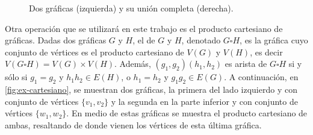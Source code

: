 \begin{figure}[htb!]
    \centering
    \caption{Dos gr\'aficas (izquierda) y su uni\'on completa (derecha).}
\label{fig:ex-unionCompleta}
\end{figure}

Otra operaci\'on que se utilizar\'a en este trabajo es el producto cartesiano de
gr\'aficas. Dadas dos gr\'aficas $G$ y $H$, el  de
$G$ y $H$, denotado $G \square H$, es la gr\'afica cuyo conjunto de v\'ertices
es el producto cartesiano de $V(G)$ y $V(H)$, es decir $V(G \square H) = V(G)
\times V(H)$. Adem\'as, $(g_1,g_2)(h_1,h_2)$ es arista de $G \square H$ si y
s\'olo si $g_1 = g_2$ y $h_1h_2 \in E(H)$, o $h_1 = h_2$ y $g_1g_2 \in E(G)$. A
continuaci\'on, en \cref{fig:ex-cartesiano}, se muestran dos gr\'aficas, la
primera del lado izquierdo y con conjunto de v\'ertices $\{v_1, v_2\}$ y la
segunda en la parte inferior y con conjunto de v\'ertices $\{w_1,w_2\}$. En
medio de estas gr\'aficas se muestra el producto cartesiano de ambas, resaltando
de donde vienen los v\'ertices de esta \'ultima gr\'afica.

